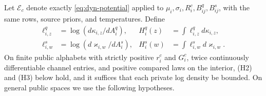 Let $\mathcal E_c$ denote exactly \cref{eq:dyn-potential} applied to $\mu_i,\sigma_i,R_i^c,B_{ij}^q,B_{ij}^s$, with the same rows, source priors, and temperatures. Define
\begin{equation}
 \begin{aligned}
 \ell_{i,z}^q&=\log(d\kappa_{i,z}/dA_i^q),&
 H_i^q(z)&=\int\ell_{i,z}^q d\kappa_{i,z},\\
 \ell_{i,w}^s&=\log(d\varkappa_{i,w}/dA_i^s),&
 H_i^s(w)&=\int\ell_{i,w}^s d\varkappa_{i,w}.
 \end{aligned}
 \label{smooth:conditional-entropies}
\end{equation}
On finite public alphabets with strictly positive $r_i^c$ and $G_i^c$, twice continuously differentiable channel entries, and positive compared laws on the interior, (H2) and (H3) below hold, and it suffices that each private log density be bounded. On general public spaces we use the following hypotheses.

